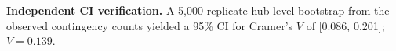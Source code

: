 \textbf{Independent CI verification.} A 5,000-replicate hub-level bootstrap from the observed contingency counts yielded a 95\% CI for Cramer's $V$ of [0.086, 0.201]; $V=0.139$.
